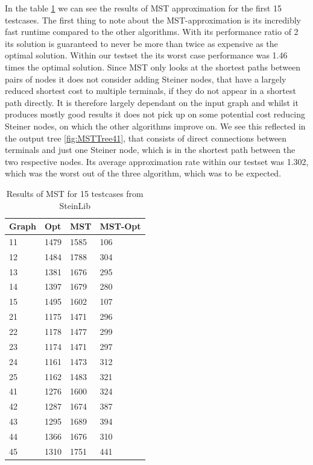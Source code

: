 In the table \ref{tab:MSTResults} we can see the results of MST approximation for the first 15 testcases. The first thing to note about the MST-approximation is its incredibly fast runtime compared to the other algorithms. With its performance ratio of 2 its solution is guaranteed to never be more than twice as expensive as the optimal solution. Within our testset the its worst case performance was 1.46 times the optimal solution. Since MST only looks at the shortest paths between pairs of nodes it does not consider adding Steiner nodes, that have a largely reduced shortest cost to multiple terminals, if they do not appear in a shortest path directly. It is therefore largely dependant on the input graph and whilst it produces mostly good results it does not pick up on some potential cost reducing Steiner nodes, on which the other algorithms improve on. We see this reflected in the output tree \ref{fig:MSTTree41}, that consists of direct connections between terminals and just one Steiner node, which is in the shortest path between the two respective nodes. Its average approximation rate within our testset was 1.302, which was the worst out of the three algorithm, which was to be expected.
\begin{table}[htbp]
 \caption{Results of MST for 15 testcases from SteinLib \cite{Dui93}}\label{tab:MSTResults} 	
 \centering
 \begin{tabular}{l l l l}
\toprule
Graph & Opt & MST & MST-Opt \\
\midrule
11	& 1479	& 1585		& 106 \\
12	& 1484	& 1788		& 304 \\
13	& 1381	& 1676		& 295 \\
14	& 1397	& 1679		& 280 \\
15	& 1495	& 1602		& 107 \\
\midrule 
21	& 1175	& 1471		& 296 \\
22	& 1178	& 1477		& 299 \\
23	& 1174	& 1471		& 297 \\
24	& 1161	& 1473	 	& 312 \\
25	& 1162	& 1483		& 321 \\
\midrule
41	& 1276	& 1600		& 324 \\
42	& 1287	& 1674		& 387 \\
43	& 1295	& 1689		& 394 \\
44	& 1366	& 1676		& 310 \\
45	& 1310	& 1751		& 441 \\
\bottomrule
\end{tabular}
\end{table}

